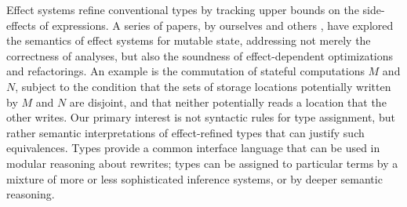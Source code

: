 \documentclass[orivec]{llncs}
\newcommand{\keywd}[1]{\mathtt{#1}}
\newcommand{\squelch}[1]{}
\newcommand{\letin}[2]{\keywd{let}\:{#1}\!\Leftarrow\!{#2}\:\keywd{in}\:}
\newcommand{\rdsin}[1]{\mathrm{rds}({#1})}
\newcommand{\wrsin}[1]{\mathrm{wrs}({#1})}
\newcommand{\eff}{\varepsilon}
\begin{document}
Effect systems \cite{DBLP:conf/lfp/GiffordL86} refine conventional
types by tracking upper bounds on the side-effects of expressions.  A
series of papers, by ourselves and others
\cite{DBLP:conf/popl/KammarP12,DBLP:conf/ppdp/BentonKBH09,DBLP:conf/ppdp/BentonKBH07,DBLP:conf/aplas/BentonKHB06,DBLP:conf/icfp/ThamsborgB11},
have explored the semantics of effect systems for mutable state,
addressing not merely the correctness of analyses, but also the
soundness of effect-dependent optimizations and refactorings. An
example is the commutation of stateful computations $M$ and $N$,
subject to the condition that the sets of storage locations
potentially written by $M$ and $N$ are disjoint, and that neither
potentially reads a location that the other writes.  \squelch{If one
  gives expressions refined monadic types of the form $T_\eff \tau$,
  meaning `computations returning results of type $\tau$ with
  side-effects bounded by $\eff$', for a suitable choice of effect
  annotations $\eff$, then effect-dependent equivalences can be
  formalized in terms of conditions on annotations. For example
  \infrule {\Gamma\vdash M:T_\eff\tau \andalso \Gamma\vdash
    N:T_{\eff'}\tau' \andalso \Gamma,x:\tau,y:\tau' \vdash
    P:T_{\eff''}\tau''\\ \wrsin{\eff}\cap
    \wrsin{\eff'}=\rdsin{\eff}\cap \wrsin{\eff'} = \rdsin{\eff'}\cap
    \wrsin{\eff}=\emptyset} {\Gamma
    \vdash \begin{array}{l}\letin{x}{M}{\letin{y}{N}{P}}\\ =
      \letin{y}{N}{\letin{x}{M}{P}}\end{array} :
    T_{\eff\cup\eff'\cup\eff''}\tau''}

\noindent
where $\rdsin{\eff}$ and $\wrsin{\eff}$ are the sets of possibly-read
and possibly-written variables (or regions) in $\eff$.} Our primary
interest is not syntactic rules for type assignment, but rather
semantic interpretations of effect-refined types that can justify such
equivalences.  Types provide a common interface language that can be
used in modular reasoning about rewrites; types can be assigned to
particular terms by a mixture of more or less sophisticated inference
systems, or by deeper semantic reasoning. \squelch{Clearly, such a
  separation of concerns requires that the interpretation of types be
  independent of any inference system.}
\end{document}
